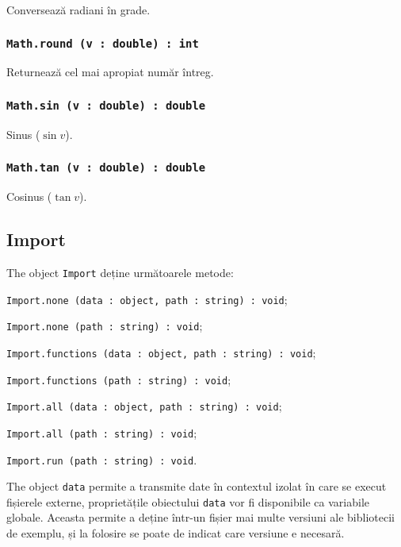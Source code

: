 Conversează radiani în grade.

\subsubsection{\texttt{Math.round (v : double) : int}}

Returnează cel mai apropiat număr întreg.

\subsubsection{\texttt{Math.sin (v : double) : double}}

Sinus ($\sin{v}$).

\subsubsection{\texttt{Math.tan (v : double) : double}}

Cosinus ($\tan{v}$).

\subsection{{\color{orange} Import}}

The object \texttt{Import} deține următoarele metode:
\begin{icItems}
	\item \texttt{Import.none (data : object, path : string) : void};
	\item \texttt{Import.none (path : string) : void};
	\item \texttt{Import.functions (data : object, path : string) : void};
	\item \texttt{Import.functions (path : string) : void};
	\item \texttt{Import.all (data : object, path : string) : void};
	\item \texttt{Import.all (path : string) : void};
	\item \texttt{Import.run (path : string) : void}.
\end{icItems}

The object \texttt{data} permite a transmite date în contextul izolat în care se execut fișierele externe, proprietățile obiectului \texttt{data} vor fi disponibile ca variabile globale. Aceasta permite a deține într-un fișier mai multe versiuni ale bibliotecii de exemplu, și la folosire se poate de indicat care versiune e necesară.

